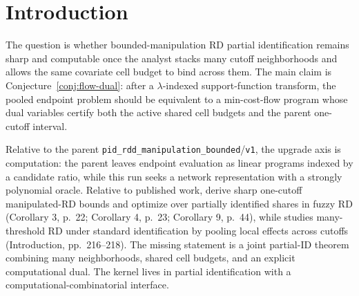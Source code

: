 \documentclass[11pt]{article}
\theoremstyle{definition}
\theoremstyle{plain}
\theoremstyle{remark}
\begin{document}
\begin{abstract}
The banked parent \texttt{pid\_rdd\_manipulation\_bounded}/\texttt{v1} characterizes a
one-cutoff bounded-manipulation RD interval through a \(\lambda\)-indexed linear-fractional
endpoint program. This proposal asks whether the many-neighborhood analogue admits a sharp
network-flow representation when several cutoff neighborhoods share manipulation budgets across
predetermined covariate cells. The headline claim is that the pooled manipulation-robust RD
support function should equal a min-cost-flow problem on a laminar neighborhood graph, with a
total-unimodular dual certificate that recovers the parent interval when \(J=1\). A second
claim is that the joint certificate is not only computationally cleaner but substantively
sharper: a binding shared cell budget can force a larger retained mass in one neighborhood once
another neighborhood uses the same scarce cell. If resolved, the result would turn current
many-cutoff RD practice from cutoff-by-cutoff sensitivity reporting into a joint sharp partial-ID
computation with an auditable dual witness.
\end{abstract}

\section{Introduction}
The question is whether bounded-manipulation RD partial identification remains sharp and
computable once the analyst stacks many cutoff neighborhoods and allows the same covariate cell
budget to bind across them. The main claim is Conjecture~\ref{conj:flow-dual}: after a
\(\lambda\)-indexed support-function transform, the pooled endpoint problem should be equivalent
to a min-cost-flow program whose dual variables certify both the active shared cell budgets and
the parent one-cutoff interval.

Relative to the parent \texttt{pid\_rdd\_manipulation\_bounded}/\texttt{v1}, the upgrade axis is
computation: the parent leaves endpoint evaluation as linear programs indexed by a candidate
ratio, while this run seeks a network representation with a strongly polynomial oracle.
Relative to published work, \citet{GerardRokkanenRothe2020} derive sharp one-cutoff manipulated-RD
bounds and optimize over partially identified shares in fuzzy RD (Corollary 3, p.~22;
Corollary 4, p.~23; Corollary 9, p.~44), while \citet{Bertanha2020} studies many-threshold RD
under standard identification by pooling local effects across cutoffs (Introduction, pp.~216--218).
The missing statement is a joint partial-ID theorem combining many neighborhoods, shared cell
budgets, and an explicit computational dual. The kernel lives in partial identification with a
computational-combinatorial interface.
\end{document}
